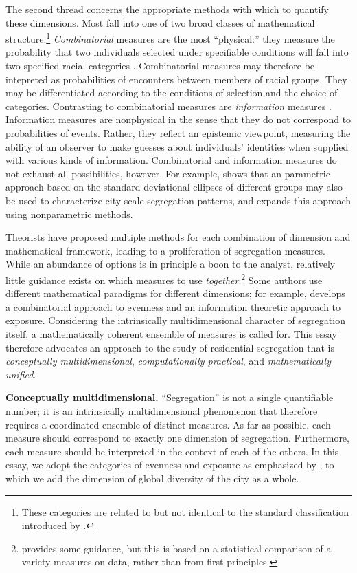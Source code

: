 \documentclass[english]{scrartcl}
\begin{document}
	The second thread concerns the appropriate methods with which to quantify these dimensions. Most fall into one of two broad classes of mathematical structure.\footnote{These categories are related to but not identical to the standard classification introduced by \cite{Coulter1989}.} \emph{Combinatorial} measures are the most ``physical:'' they measure the probability that two individuals selected under specifiable conditions will fall into two specified racial categories \cite{Goodman1954,James1986}. Combinatorial measures may therefore be intepreted as probabilities of encounters between members of racial groups. They may be differentiated according to the conditions of selection and the choice of categories. Contrasting to combinatorial measures are \emph{information} measures \cite{Theil1971,Theil1967,Roberto2015a}. Information measures are nonphysical in the sense that they do not correspond to probabilities of events. Rather, they reflect an epistemic viewpoint, measuring the ability of an observer to make guesses about individuals' identities when supplied with various kinds of information. Combinatorial and information measures do not exhaust all possibilities, however. For example, \cite{Wong1999} shows that an parametric approach based on the standard deviational ellipses of different groups may also be used to characterize city-scale segregation patterns, and \cite{Osullivan2007} expands this approach using nonparametric methods.

	Theorists have proposed multiple methods for each combination of dimension and mathematical framework, leading to a proliferation of segregation measures. While an abundance of options is in principle a boon to the analyst, relatively little guidance exists on which measures to use \emph{together}.\footnote{\cite{Massey1988} provides some guidance, but this is based on a statistical comparison of a variety measures on data, rather than from first principles.} Some authors use different mathematical paradigms for different dimensions; for example, \cite{Reardon2004} develops a combinatorial approach to evenness and an information theoretic approach to exposure. Considering the intrinsically multidimensional character of segregation itself, a mathematically coherent ensemble of measures is called for. This essay therefore advocates an approach to the study of residential segregation that is \emph{conceptually multidimensional}, \emph{computationally practical}, and \emph{mathematically unified}. 

	\textbf{Conceptually multidimensional.} ``Segregation'' is not a single quantifiable number; it is an intrinsically multidimensional phenomenon that therefore requires a coordinated ensemble of distinct measures. As far as possible, each measure should correspond to exactly one dimension of segregation. Furthermore, each measure should be interpreted in the context of each of the others. In this essay, we adopt the categories of evenness and exposure as emphasized by \cite{Reardon2004}, to which we add the dimension of global diversity of the city as a whole. 
\end{document}
